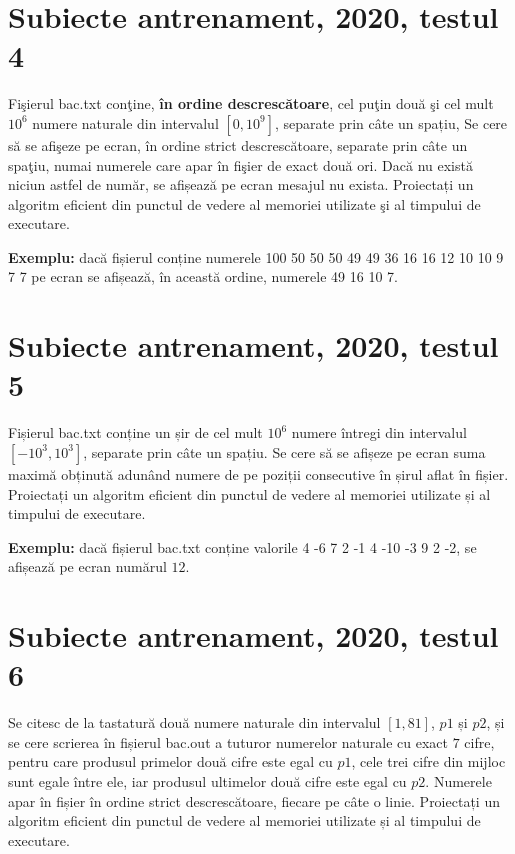 \documentclass[10pt, a4paper]{article}
\newcommand{\highlight}[1]{{\ttfamily\color{red}#1}}
\begin{document}
\section{Subiecte antrenament, 2020, testul 4}
Fişierul \highlight{bac.txt} conţine, \textbf{în ordine descrescătoare}, cel puţin două şi cel mult \highlight{$10^6$} numere naturale din intervalul \highlight{$[0,10^9]$}, separate prin câte un spațiu,  Se cere să se afişeze pe ecran, în ordine strict descrescătoare, separate prin câte un spaţiu, numai numerele care apar în fişier de exact două ori. Dacă nu există niciun astfel de număr, se afișează pe ecran mesajul \highlight{nu exista}. Proiectați un algoritm eficient din punctul de vedere al memoriei utilizate şi al timpului de executare.

\vspace{0.2cm}
\noindent \textbf{Exemplu:} dacă fișierul conține numerele \highlight{100 50 50 50 49 49 36 16 16 12 10 10 9 7 7} pe ecran se afișează, în această ordine, numerele \highlight{49 16 10 7}.

\section{Subiecte antrenament, 2020, testul 5}
Fișierul \highlight{bac.txt} conține un șir de cel mult \highlight{$10^6$} numere întregi din intervalul \highlight{$[-10^3,10^3]$}, separate prin câte un spațiu. Se cere să se afișeze pe ecran suma maximă obținută adunând numere de pe poziții consecutive în șirul aflat în fișier. Proiectați un algoritm eficient din punctul de vedere al memoriei utilizate și al timpului de executare. 

\vspace{0.2cm}
\noindent \textbf{Exemplu:} dacă fișierul \highlight{bac.txt} conține valorile \highlight{4 -6 7 2 -1 4 -10 -3 9 2 -2}, se afișează pe ecran numărul \highlight{$12$}.


\section{Subiecte antrenament, 2020, testul 6}
Se citesc de la tastatură două numere naturale din intervalul \highlight{$[1,81]$}, \highlight{$p1$} și \highlight{$p2$}, și se cere scrierea în fișierul \highlight{bac.out} a tuturor numerelor naturale cu exact \highlight{$7$} cifre, pentru care produsul primelor două cifre este egal cu \highlight{$p1$}, cele trei cifre din mijloc sunt egale între ele, iar produsul ultimelor două cifre este egal cu \highlight{$p2$}. Numerele apar în fișier în ordine strict descrescătoare, fiecare pe câte o linie. Proiectați un algoritm eficient din punctul de vedere al memoriei utilizate și al timpului de executare.
\end{document}
